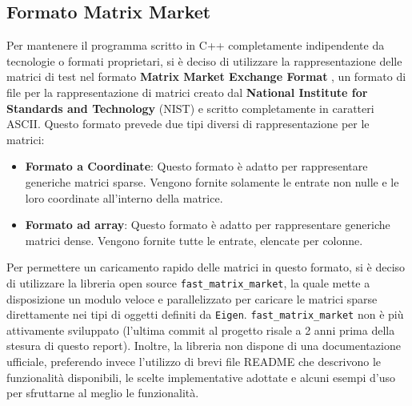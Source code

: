 \subsection{Formato Matrix Market}
Per mantenere il programma scritto in C++ completamente indipendente da tecnologie o formati proprietari, si è deciso
di utilizzare la rappresentazione delle matrici di test nel formato \textbf{Matrix Market Exchange Format} \cite{matrix_market}, un formato di file per la rappresentazione di matrici creato dal \textbf{National Institute for Standards and Technology} (NIST) e scritto completamente in caratteri ASCII.
Questo formato prevede due tipi diversi di rappresentazione per le matrici:
\begin{itemize}
	\item \textbf{Formato a Coordinate}: Questo formato è adatto per rappresentare generiche matrici sparse. Vengono fornite solamente le entrate non nulle e le loro coordinate all'interno della matrice.
	\item \textbf{Formato ad array}: Questo formato è adatto per rappresentare generiche matrici dense. Vengono fornite tutte le entrate, elencate per colonne.
\end{itemize}
Per permettere un caricamento rapido delle matrici in questo formato, si è deciso di utilizzare la libreria open source \texttt{fast\_matrix\_market}\cite{lugowski_fast_matrix_market_2023},
la quale mette a disposizione un modulo veloce e parallelizzato per caricare le matrici sparse direttamente nei tipi di oggetti definiti da \texttt{Eigen}.
\texttt{fast\_matrix\_market} non è più attivamente sviluppato (l'ultima commit al progetto risale a 2 anni prima della stesura di questo report).
Inoltre, la libreria non dispone di una documentazione ufficiale, preferendo invece l'utilizzo di brevi file README che descrivono le funzionalità disponibili, le scelte implementative adottate e alcuni esempi d’uso per sfruttarne al meglio le funzionalità.
